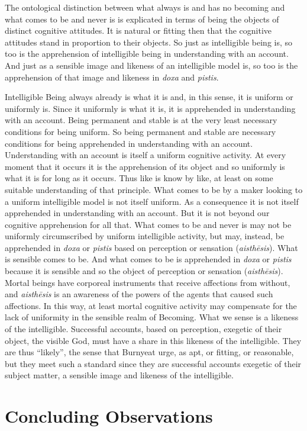 The ontological distinction between what always is and has no becoming and what comes to be and never is is explicated in terms of being the objects of distinct cognitive attitudes. It is natural or fitting then that the cognitive attitudes stand in proportion to their objects. So just as intelligible being is, so too is the apprehension of intelligible being in understanding with an account. And just as a sensible image and likeness of an intelligible model is, so too is the apprehension of that image and likeness in \emph{doxa} and \emph{pistis}. 

Intelligible Being always already is what it is and, in this sense, it is uniform or uniformly is. Since it uniformly is what it is, it is apprehended in understanding with an account. Being permanent and stable is at the very least necessary conditions for being uniform. So being permanent and stable are necessary conditions for being apprehended in understanding with an account. Understanding with an account is itself a uniform cognitive activity. At every moment that it occurs it is the apprehension of its object and so uniformly is what it is for long as it occurs. Thus like is know by like, at least on some suitable understanding of that principle. What comes to be by a maker looking to a uniform intelligible model is not itself uniform. As a consequence it is not itself apprehended in understanding with an account. But it is not beyond our cognitive apprehension for all that. What comes to be and never is may not be uniformly circumscribed by uniform intelligible activity, but may, instead, be apprehended in \emph{doxa} or \emph{pistis} based on perception or sensation (\emph{aisthēsis}). What is sensible comes to be. And what comes to be is apprehended in \emph{doxa} or \emph{pistis} because it is sensible and so the object of perception or sensation (\emph{aisthēsis}). Mortal beings have corporeal instruments that receive affections from without, and \emph{aisthēsis} is an awareness of the powers of the agents that caused such affections. In this way, at least mortal cognitive activity may compensate for the lack of uniformity in the sensible realm of Becoming. What we sense is a likeness of the intelligible. Successful accounts, based on perception, exegetic of their object, the visible God, must have a share in this likeness of the intelligible. They are thus ``likely'', the sense that Burnyeat urge, as apt, or fitting, or reasonable, but they meet such a standard since they are successful accounts exegetic of their subject matter, a sensible image and likeness of the intelligible.




\section{Concluding Observations} %
\label{sec:concluding_observations}





